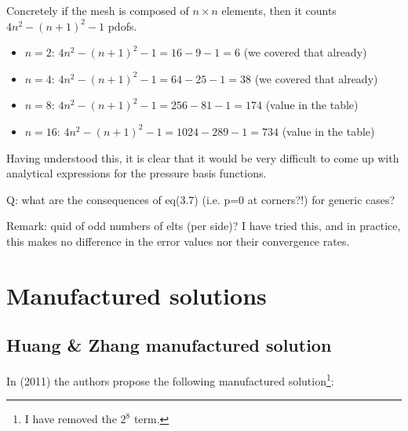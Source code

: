 Concretely if the mesh is composed of $n \times n$ elements, then it 
counts $4n^2 - (n+1)^2  -1$ pdofs.
\begin{itemize}
\item $n=2$:  $4n^2 - (n+1)^2 -1= 16 -9 -1=6 $ (we covered that already)
\item $n=4$:  $4n^2 - (n+1)^2 -1= 64 -25 -1=38 $ (we covered that already)
\item $n=8$:  $4n^2 - (n+1)^2 -1= 256 -81 -1=174 $ (value in the table)
\item $n=16$: $4n^2 - (n+1)^2 -1= 1024 -289 -1= 734$ (value in the table)
\end{itemize}

Having understood this, it is clear that it would be very difficult 
to come up with analytical expressions for the pressure basis functions. 

{\color{red} Q: what are the consequences of eq(3.7) (i.e. p=0 at corners?!) for 
generic cases?}

Remark: quid of odd numbers of elts (per side)? I have tried this, 
and in practice, this makes no difference in the error values nor their 
convergence rates.

\section*{Manufactured solutions}

\subsection*{Huang \& Zhang manufactured solution}

In \textcite{huzh11} (2011) the authors propose the 
following manufactured solution\footnote{I have removed the $2^8$ term.}:

